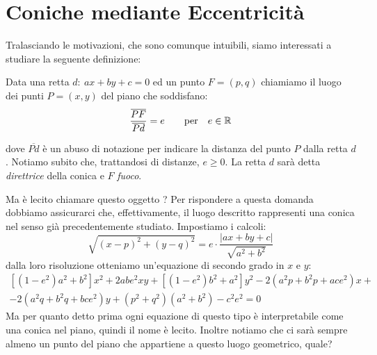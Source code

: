 \documentclass[a4paper, oneside]{article}
\begin{document}
	\newpage
	\section{Coniche mediante Eccentricità}
		Tralasciando le motivazioni, che sono comunque intuibili, siamo interessati a studiare la seguente definizione:
		\begin{defin}
			Data una retta $d:\ ax+by+c=0$ ed un punto $F=(p,q)$ chiamiamo  il luogo dei punti $P=(x,y)$ del piano che soddisfano:
			\begin{equation*}
				\frac{\overline{PF}}{\overline{Pd}}=e \qquad \mathrm{per} \quad e\in\mathbb{R}
			\end{equation*} 
		\end{defin}
		dove $\overline{Pd}$ è un abuso di notazione per indicare la distanza del punto $P$ dalla retta $d$. Notiamo subito che, trattandosi di distanze, $e\geq0$. La retta $d$ sarà detta \emph{direttrice} della conica e $F$ \emph{fuoco}.
		
		Ma è lecito chiamare questo oggetto ? Per rispondere a questa domanda dobbiamo assicurarci che, effettivamente, il luogo descritto rappresenti una conica nel senso già precedentemente studiato. Impostiamo i calcoli:
		\begin{equation*}
			\sqrt{(x-p)^2+(y-q)^2}= e\cdot\frac{|ax+by+c|}{\sqrt{a^2+b^2}}
		\end{equation*}
		dalla loro risoluzione otteniamo un'equazione di secondo grado in $x$ e $y$:
		\begin{align} \label{eq:ecc}
			\left[\left(1-e^{2}\right) a^{2}+b^{2}\right] x^{2}+2 a b e^{2} x y+\left[\left(1-e^{2}\right) b^{2}+a^{2}\right] y^{2}-2\left(a^{2} p+b^{2} p+a c e^{2}\right) x + \nonumber \\
			-2\left(a^{2} q+b^{2} q+b c e^{2}\right) y+\left(p^{2}+q^{2}\right)\left(a^{2}+b^{2}\right)-c^{2} e^{2}=0
		\end{align}
		Ma per quanto detto prima ogni equazione di questo tipo è interpretabile come una conica nel piano, quindi il nome è lecito. Inoltre notiamo che ci sarà sempre almeno un punto del piano che appartiene a questo luogo geometrico, quale?
		
\end{document}
